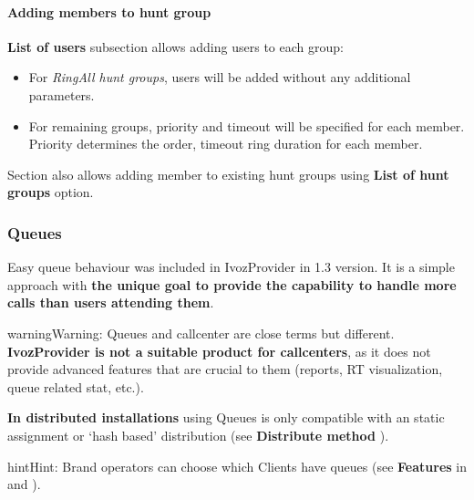 \documentclass[letterpaper,10pt,english]{sphinxmanual}
\begin{document}
\paragraph{Adding members to hunt group}
\label{administration_portal/client/vpbx/routing_endpoints/hunt_groups:adding-members-to-hunt-group}
\textbf{List of users} subsection allows adding users to each group:
\begin{itemize}
\item {} 
For \emph{RingAll hunt groups}, users will be added without any additional parameters.

\item {} 
For remaining groups, priority and timeout will be specified for each member. Priority determines the order, timeout ring
duration for each member.

\end{itemize}

Section {\hyperref[administration_portal/client/vpbx/users:users]{}} also allows adding member to existing hunt groups using \textbf{List of hunt groups} option.


\subsubsection{Queues}
\label{administration_portal/client/vpbx/routing_endpoints/queues:queues}\label{administration_portal/client/vpbx/routing_endpoints/queues::doc}
Easy queue behaviour was included in IvozProvider in 1.3 version. It is a simple
approach with \textbf{the unique goal to provide the capability to handle more calls
than users attending them}.

\begin{notice}{warning}{Warning:}
Queues and callcenter are close terms but different. \textbf{IvozProvider
is not a suitable product for callcenters}, as it does not provide
advanced features that are crucial to them (reports, RT visualization,
queue related stat, etc.).
\end{notice}

\textbf{In distributed installations} using Queues is only compatible with an static
assignment or `hash based' distribution (see \textbf{Distribute method} {\hyperref[administration_portal/brand/clients/virtual_pbx:virtual\string-pbx]{}}).

\begin{notice}{hint}{Hint:}
Brand operators can choose which Clients have queues (see \textbf{Features}
in {\hyperref[getting_started/internal_calls/brand_portal:brand\string-configuration]{}} and {\hyperref[getting_started/internal_calls/client_portal:client\string-configuration]{}}).
\end{notice}
\end{document}
